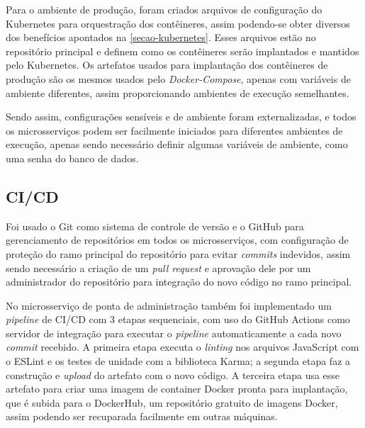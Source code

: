 Para o ambiente de produção, foram criados arquivos de configuração do Kubernetes para orquestração dos contêineres, assim podendo-se obter diversos dos benefícios apontados na \autoref{secao-kubernetes}. Esses arquivos estão no repositório principal e definem como os contêineres serão implantados e mantidos pelo Kubernetes. Os artefatos usados para implantação dos contêineres de produção são os mesmos usados pelo \emph{Docker-Compose}, apenas com variáveis de ambiente diferentes, assim proporcionando ambientes de execução semelhantes.


Sendo assim, configurações sensíveis e de ambiente foram externalizadas, e todos os microsserviços podem ser facilmente iniciados para diferentes ambientes de execução, apenas sendo necessário definir algumas variáveis de ambiente, como uma senha do banco de dados.


\subsection{CI/CD}
Foi usado o Git como sistema de controle de versão e o GitHub para gerenciamento de repositórios em todos os microsserviços, com configuração de proteção do ramo principal do repositório para evitar \emph{commits} indevidos, assim sendo necessário a criação de um \emph{pull request} e aprovação dele por um administrador do repositório para integração do novo código no ramo principal. 

No microsserviço de ponta de administração também foi implementado um \emph{pipeline} de CI/CD com 3 etapas sequenciais, com uso do GitHub Actions como servidor de integração para executar o \emph{pipeline} automaticamente a cada novo \emph{commit} recebido. A primeira etapa executa o \emph{linting} nos arquivos JavaScript com o ESLint e os testes de unidade com a biblioteca Karma; a segunda etapa faz a construção e \emph{upload} do artefato com o novo código. A terceira etapa usa esse artefato para criar uma imagem de container Docker pronta para implantação, que é subida para o DockerHub, um repositório gratuito de imagens Docker, assim podendo ser recuparada facilmente em outras máquinas. 

